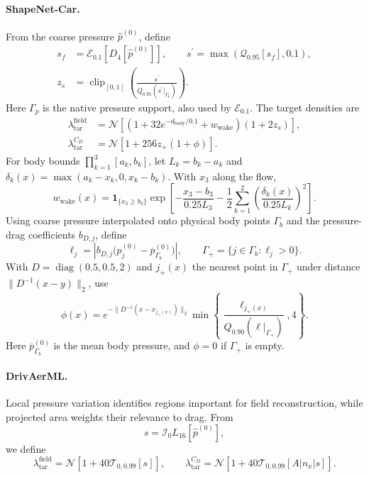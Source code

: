 \paragraph{ShapeNet-Car.}
From the coarse pressure $\widehat p^{(0)}$, define
\begin{equation}
    \begin{aligned}
    s_f&=\mathcal{E}_{0.1}[D_4[\widehat p^{(0)}]],
    \qquad s^\prime=\max(\mathcal{Q}_{0.95}[s_f],0.1),\\
    z_s&=\operatorname{clip}_{[0,1]}\!\left(
        \frac{s^\prime}{Q_{0.95}(s^\prime|_{\Gamma_p})}
    \right).
    \end{aligned}
    \label{eq:app_cpg_car_scores}
\end{equation}
Here $\Gamma_p$ is the native pressure support, also used by
$\mathcal E_{0.1}$. The target densities are
\begin{equation}
    \begin{aligned}
    \lambda_{\mathrm{tar}}^{\mathrm{field}}
        &=\mathcal{N}\!\left[
            (1+32e^{-d_{\mathrm{body}}/0.1}+w_{\mathrm{wake}})(1+2z_s)
          \right],\\
    \lambda_{\mathrm{tar}}^{C_D}
        &=\mathcal{N}[1+256z_+(1+\phi)].
    \end{aligned}
    \label{eq:app_density_car}
\end{equation}
For body bounds $\prod_{k=1}^{3}[a_k,b_k]$, let $L_k=b_k-a_k$ and
$\delta_k(x)=\max(a_k-x_k,0,x_k-b_k)$. With $x_3$ along the flow,
\[
    w_{\mathrm{wake}}(x)
    =\mathbf 1_{\{x_3\geq b_3\}}
      \exp\!\left[
        -\frac{x_3-b_3}{0.25L_3}
        -\frac12\sum_{k=1}^{2}
          \left(\frac{\delta_k(x)}{0.25L_k}\right)^2
      \right].
\]
Using coarse pressure interpolated onto physical body points $\Gamma_b$
and the pressure-drag coefficients $b_{D,j}$, define
\[
    \ell_j=\left|b_{D,j}\bigl(\widehat p_j^{(0)}
               -\overline p_{\Gamma_b}^{(0)}\bigr)\right|,
    \qquad \Gamma_+=\{j\in\Gamma_b:\ell_j>0\}.
\]
With $D=\operatorname{diag}(0.5,0.5,2)$ and $j_+(x)$ the nearest point in
$\Gamma_+$ under distance $\|D^{-1}(x-y)\|_2$, use
\[
    \phi(x)
    =e^{-\|D^{-1}(x-x_{j_+(x)})\|_2}
      \min\!\left\{
        \frac{\ell_{j_+(x)}}{Q_{0.90}(\ell|_{\Gamma_+})},4
      \right\}.
\]
Here $\overline p_{\Gamma_b}^{(0)}$ is the mean body pressure, and
$\phi=0$ if $\Gamma_+$ is empty.

\paragraph{DrivAerML.}
Local pressure variation identifies regions important for field reconstruction,
while projected area weights their relevance to drag. From
\[
    s=\mathcal{I}_0L_{16}[\widehat p^{(0)}],
\]
we define
\begin{equation}
    \lambda_{\mathrm{tar}}^{\mathrm{field}}
    =\mathcal{N}\!\left[
        1+40\mathcal{T}_{0,0.99}[s]
    \right],
    \qquad
    \lambda_{\mathrm{tar}}^{C_D}
    =\mathcal{N}\!\left[
        1+40\mathcal{T}_{0,0.99}[A|n_x|s]
    \right].
    \label{eq:app_cpg_drivaerml_density}
\end{equation}

